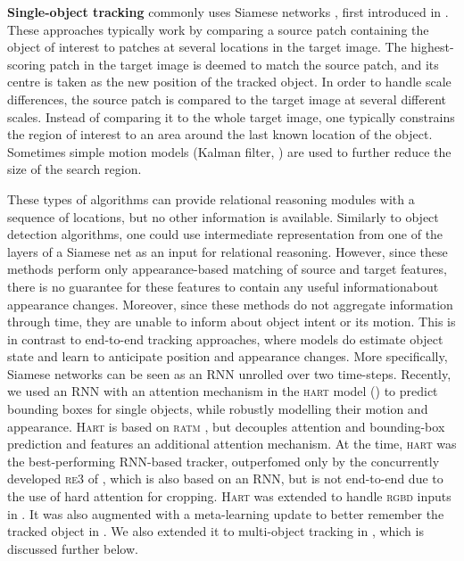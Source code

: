 %	
%
	\textbf{Single-object tracking} commonly uses Siamese networks \citep{Valmadre2017,Held2016goturn}, first introduced in \citep{Bromley1993siamese}.
	These approaches typically work by comparing a source patch containing the object of interest to patches at several locations in the target image.
	The highest-scoring patch in the target image is deemed to match the source patch, and its centre is taken as the new position of the tracked object.
	In order to handle scale differences, the source patch is compared to the target image at several different scales.
	Instead of comparing it to the whole target image, one typically constrains the region of interest to an area around the last known location of the object.
	Sometimes simple motion models (\!\eg Kalman filter, \cite{Swerling1959kalman,Kalman1961kalman}) are used to further reduce the size of the search region.
	
	These types of algorithms can provide relational reasoning modules with a sequence of locations, but no other information is available.
	Similarly to object detection algorithms, one could use intermediate representation from one of the layers of a Siamese net as an input for relational reasoning.
	However, since these methods perform only appearance-based matching of source and target features, there is no guarantee for these features to contain any useful information\eg about appearance changes.
	Moreover, since these methods do not aggregate information through time, they are unable to inform about object intent or its motion.
	This is in contrast to end-to-end tracking approaches, where models do estimate object state and learn to anticipate position and appearance changes.
	More specifically, Siamese networks can be seen as an \gls{RNN} unrolled over two time-steps.
	Recently, we used an \gls{RNN} with an attention mechanism in the \textsc{hart} model () to predict bounding boxes for single objects, while robustly modelling their motion and appearance.
	\textsc{Hart} is based on \textsc{ratm} \citep{Kahou2015ratm}, but decouples attention and bounding-box prediction and features an additional attention mechanism.
	At the time, \textsc{hart} was the best-performing \gls{RNN}-based tracker, outperfomed only by the concurrently developed \textsc{re3} of \cite{Gordon2018re3}, which is also based on an \gls{RNN}, but is not end-to-end due to the use of hard attention for cropping.
	\textsc{Hart} was extended to handle \textsc{rgbd} inputs in \cite{Danesh2019deep}. 
	It was also augmented with a meta-learning update to better remember the tracked object in \cite{Li2019metahart}. We also extended it to multi-object tracking in , which is discussed further below.
	
